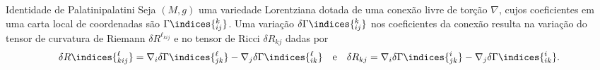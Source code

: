 \documentclass[portuguese]{artigo}
\begin{document}
\begin{lemma}{Identidade de Palatini}{palatini}
    Seja \((M, g)\) uma variedade Lorentziana dotada de uma conexão livre de torção \(\nabla\), cujos coeficientes em uma carta local de coordenadas são \(\Gamma\indices{^k_{ij}}\). Uma variação \(\delta \Gamma\indices{^k_{ij}}\) nos coeficientes da conexão resulta na variação do tensor de curvatura de Riemann \(\delta R^{\ell_{kij}}\) e no tensor de Ricci \(\delta R_{kj}\) dadas por
    \begin{equation*}
        \delta R\indices{^\ell_{kij}} = \nabla_i \delta \Gamma\indices{^\ell_{jk}} - \nabla_j \delta \Gamma\indices{^\ell_{ik}}
        \quad\text{e}\quad
        \delta R_{kj} = \nabla_i \delta \Gamma\indices{^i_{jk}} - \nabla_j \delta \Gamma\indices{^i_{ik}}.
    \end{equation*}
\end{lemma}
\end{document}
